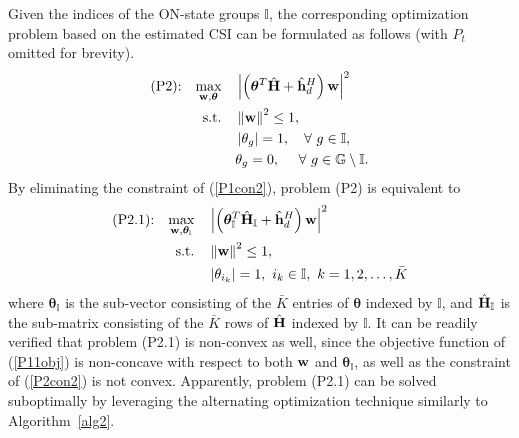 \documentclass[draftclsnofoot,onecolumn,12pt]{IEEEtran}
\begin{document}
Given the indices of the ON-state groups $\mathbb{I}$, the corresponding optimization problem based on the estimated CSI  can be formulated as follows (with $P_t$ omitted for brevity). 
\begin{align}
\text{(P2):} \quad \underset{{\bf w},{\bm \theta}}{\text{max}}
& \quad \left|\left({\bm \theta}^T \hat{\bf H} + \hat{\bf h}_d^H\right) {\bf w}\right|^2\label{P1obj}\\
 \text{s.t.} & \quad \left\| {\bf w}\right\|^2 \le 1,\\
& \quad \left|\theta_g\right|=1, \quad\forall~ g  \in \mathbb{I}\label{P1con1},\\
& \quad \theta_g =0,\quad~\forall~ g  \in \mathbb{G}\setminus \mathbb{I}\label{P1con2}.
\end{align}
By eliminating the constraint of (\ref{P1con2}), problem (P2) is equivalent to 
\begin{align}
\text{(P2.1):} \quad \label{P11obj}
 \underset{{\bf w},{\bm \theta}_{\mathbb I}}{\text{max}}
& \quad \left|\left( {\bm \theta}_{\mathbb I}^T \hat{\bf H}_{\mathbb I} + \hat{\bf h}_d^H\right) {\bf w}\right|^2\\
 \text{s.t.} & \quad \left\| {\bf w}\right\|^2 \le 1,\\
& \quad  \left|\theta_{i_k}\right|=1 ,~ i_k  \in \mathbb{I}, ~ k=1,2,\ldots,{\bar{K}}\label{P2con2}
\end{align}
where ${\bm \theta}_{\mathbb I}$ is the sub-vector consisting of the $\bar K$ entries of ${\bm \theta}$ indexed by ${\mathbb I}$, and $ \hat{\bf H}_{\mathbb I}$ is the sub-matrix consisting of the $\bar K$ rows of $\hat{\bf H}$ indexed by ${\mathbb I}$. 
It can be readily verified that problem (P2.1) is non-convex as well, since the objective function of (\ref{P11obj}) is non-concave with respect to both ${\bf w}$ and ${\bm \theta}_{\mathbb I}$, as well as the constraint of (\ref{P2con2}) is not convex. 
Apparently, problem (P2.1) can be solved suboptimally by leveraging the alternating optimization technique similarly to Algorithm~\ref{alg2}. 
\end{document}
